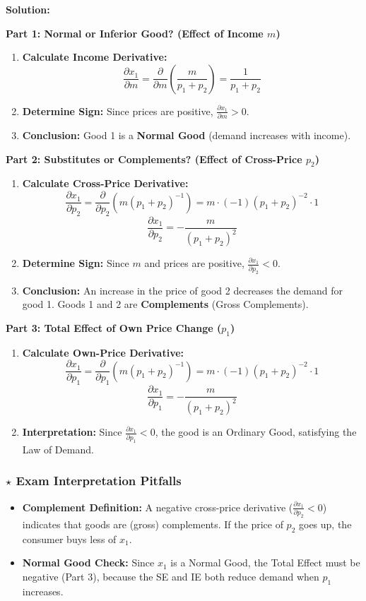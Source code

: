 \documentclass{article}
\begin{document}
\textbf{Solution:}

\textbf{Part 1: Normal or Inferior Good? (Effect of Income $m$)}
\begin{enumerate}
    \item \textbf{Calculate Income Derivative:}
    \[ \frac{\partial x_1}{\partial m} = \frac{\partial}{\partial m} \left( \frac{m}{p_1 + p_2} \right) = \frac{1}{p_1 + p_2} \]
    \item \textbf{Determine Sign:} Since prices are positive, $\frac{\partial x_1}{\partial m} > 0$.
    \item \textbf{Conclusion:} Good 1 is a \textbf{Normal Good} (demand increases with income).
\end{enumerate}

\textbf{Part 2: Substitutes or Complements? (Effect of Cross-Price $p_2$)}
\begin{enumerate}
    \item \textbf{Calculate Cross-Price Derivative:}
    \[ \frac{\partial x_1}{\partial p_2} = \frac{\partial}{\partial p_2} \left( m (p_1 + p_2)^{-1} \right) = m \cdot (-1) (p_1 + p_2)^{-2} \cdot 1 \]
    \[ \frac{\partial x_1}{\partial p_2} = -\frac{m}{(p_1 + p_2)^2} \]
    \item \textbf{Determine Sign:} Since $m$ and prices are positive, $\frac{\partial x_1}{\partial p_2} < 0$.
    \item \textbf{Conclusion:} An increase in the price of good 2 decreases the demand for good 1. Goods 1 and 2 are \textbf{Complements} (Gross Complements).
\end{enumerate}

\textbf{Part 3: Total Effect of Own Price Change ($p_1$)}
\begin{enumerate}
    \item \textbf{Calculate Own-Price Derivative:}
    \[ \frac{\partial x_1}{\partial p_1} = \frac{\partial}{\partial p_1} \left( m (p_1 + p_2)^{-1} \right) = m \cdot (-1) (p_1 + p_2)^{-2} \cdot 1 \]
    \[ \frac{\partial x_1}{\partial p_1} = -\frac{m}{(p_1 + p_2)^2} \]
    \item \textbf{Interpretation:} Since $\frac{\partial x_1}{\partial p_1} < 0$, the good is an Ordinary Good, satisfying the Law of Demand.
\end{enumerate}

\subsubsection*{$\star$ Exam Interpretation Pitfalls}
\begin{itemize}
    \item \textbf{Complement Definition:} A negative cross-price derivative ($\frac{\partial x_1}{\partial p_2} < 0$) indicates that goods are (gross) complements. If the price of $p_2$ goes up, the consumer buys less of $x_1$.
    \item \textbf{Normal Good Check:} Since $x_1$ is a Normal Good, the Total Effect must be negative (Part 3), because the SE and IE both reduce demand when $p_1$ increases.
\end{itemize}

\hrulefill
\end{document}
